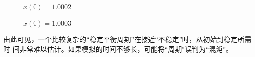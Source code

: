 \documentclass[dvipsnames, svgnames,a4paper,11pt]{article}
\begin{document}
\begin{question}
\begin{figure}[H]
	\caption{$x(0)=1.0002$}     
\end{figure}

\begin{figure}[H]     
	\centering  %

	\caption{$x(0)=1.0003$}     
\end{figure}
{\color{red}由此可见，一个比较复杂的“稳定平衡周期”在接近“不稳定”时，从初始到稳定所需时
间非常难以估计。如果模拟的时间不够长，可能将“周期”误判为“混沌”。

}
\end{question}
\end{document}
